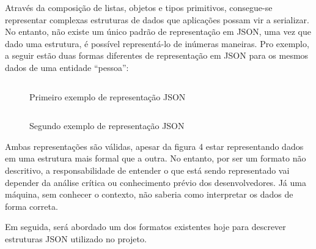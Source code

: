 \begin{table}[H]
  \centering
  \caption{Exemplo de tipos de valores em JSON}
\end{table}

Através da composição de listas, objetos e tipos primitivos, consegue-se representar complexas estruturas de dados que aplicações possam vir a serializar. No entanto, não existe um único padrão de representação em JSON, uma vez que dado uma estrutura, é possível representá-lo de inúmeras maneiras. Pro exemplo, a seguir estão duas formas diferentes de representação em JSON para os mesmos dados de uma entidade “pessoa”:
 \cite{Droettboom2015}

\begin{figure}[H]
  \centering
  \inputminted[frame=single,framesep=10pt]{javascript}{anexos/pessoa.json}
  \caption{Primeiro exemplo de representação JSON}
\end{figure}

\begin{figure}[H]
  \centering
  \inputminted[frame=single,framesep=10pt]{javascript}{anexos/pessoa-2.json}
  \caption{Segundo exemplo de representação JSON}
\end{figure}

Ambas representações são válidas, apesar da figura 4 estar representando dados em uma estrutura mais formal que a outra. No entanto, por ser um formato não descritivo, a responsabilidade de entender o que está sendo representado vai depender da análise crítica ou conhecimento prévio dos desenvolvedores. Já uma máquina, sem conhecer o contexto, não saberia como interpretar os dados de forma correta. \cite{Droettboom2015}

Em seguida, será abordado um dos formatos existentes hoje para descrever estruturas JSON utilizado no projeto.


